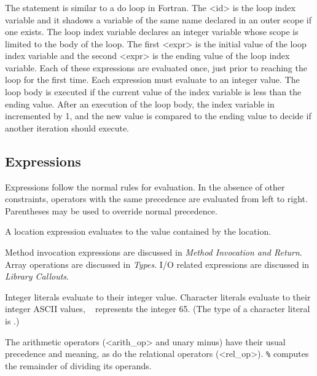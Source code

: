 
\subsubsection*{}
The  statement is similar to a {\kw do} loop in Fortran.  The
{\bnf <id>} is the loop index variable and it shadows a variable of
the same name declared in an outer scope if one exists.  The loop
index variable declares an integer variable whose scope is limited to
the body of the loop.   The first {\bnf<expr>} is the initial value
of the loop index variable and the second {\bnf<expr>} is the ending
value of the loop index variable.  Each of these expressions are
evaluated once, just prior to reaching the loop for the first time.
Each expression must evaluate to an integer value.
The loop body is executed if the current value of the index variable
is less than the ending value.  After an execution of the
loop body, the index variable in incremented by 1, and the new value
is compared to the ending value to decide if another iteration should
execute.

\subsection*{Expressions}

Expressions follow the normal rules for evaluation.  In the absence of
other constraints, operators with the same precedence are evaluated from
left to right.  Parentheses may be used to override normal precedence.

A location expression evaluates to the value contained by the location.

Method invocation expressions are discussed in {\em Method Invocation
and Return}.  Array operations are discussed in {\em Types}.  I/O
related expressions are discussed in {\em Library Callouts}.

Integer literals evaluate to their integer value.  Character literals
evaluate to their integer ASCII values, \eg\  represents the
integer 65.  (The type of a character literal is .)

The arithmetic operators ({\bnf <arith_op>} and unary minus) have
their usual precedence and meaning, as do the relational operators
({\bnf <rel_op>}).  {\tt \%} computes the remainder of dividing its
operands. 

